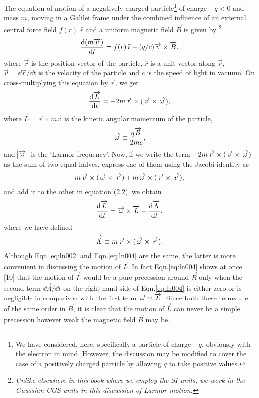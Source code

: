 The equation of motion of a negatively-charged 
particle\footnote{We have considered, here, specifically a 
particle of charge $-q$, obviously with the electron in 
mind. However, the discussion may be modified to cover the 
case of a positively charged particle by allowing $q$ to 
take positive values.} of char\-ge $-q < 0$ and mass $m$, 
moving in a Galilei frame under the combined influence of 
an external central force field $f(r)$ $\hat{r}$ and a 
uniform magnetic field $\vec{B}$ is given by 
\footnote{\textsl{Unlike elsewhere in this book where we 
employ the SI units, we work in the Gaussian CGS units in 
this discussion of Larmor motion.}}
\begin{align}
\frac{\mathrm{d}{(m\overrightarrow{v})}}{\mathrm{d}{t}} = f(r)\,{{\widehat{r}}} -
(q/c){\overrightarrow{v}}\times{\overrightarrow{B}},
\label{eq:ln001}
\end{align}
where $\vec{r}$ is the position vector of the particle, 
$\hat{r}$ is a unit vector along $\vec{r}$, $\vec{v} = 
\dd\vec{r}/\dd t$ is the velocity of the particle and $c$ 
is 
the speed of light in vacuum. On cross-multiplying this 
equation by $\vec{r}$, we get
\begin{align}
\frac{\mathrm{d}{\overrightarrow{L}}}{\mathrm{d}{t}} =
-2m{\overrightarrow{r}}\times{({\overrightarrow{v}}\times{\overrightarrow{\ensuremath{{\omega}}}})},
\label{eq:ln002}
\end{align}
where $\vec{L} = \vec{r}\times{m\vec{v}}$ is the kinetic
angular momentum of the particle,
\begin{align}
 \overrightarrow{{\omega}} \equiv \frac{q\overrightarrow{B}}{2mc},
\label{eq:ln003}
\end{align}
and $\abs{\overrightarrow{{\omega}}}$ is the `Larmor frequency'. Now, if 
we 
write the term $-2m{\overrightarrow{r}}\times{({\overrightarrow{v}}} 
\times{{\overrightarrow{\ensuremath{{\omega}}}})}$ as the sum of two equal halves, 
express one of them using the Jacobi identity as \[ 
m{\overrightarrow{v}}\times{({\overrightarrow{\ensuremath{{\omega}}}}\times{\overrightarrow{r}})} + 
m{\overrightarrow{{\omega}}}\times{({\overrightarrow{r}}\times{\overrightarrow{v}})}, \] and add 
it 
to the other in equation (2.2), we obtain
\begin{align}
\frac{\mathrm{d}{\overrightarrow{L}}}{\mathrm{d}{t}} = {\overrightarrow{{\omega}}}\times{\overrightarrow{L}} +
\frac{\mathrm{d}{\overrightarrow{\Lambda}}}{\mathrm{d}{t}},
\label{eq:ln004}
\end{align}
where we have defined
\begin{align}
 \overrightarrow{\Lambda} \equiv
m{\overrightarrow{r}}\times{({\overrightarrow{\ensuremath{{\omega}}}}\times{\overrightarrow{r}})}.
\label{eq:ln005}
\end{align}
Although Eqn.\eqref{eq:ln002} and Eqn.\eqref{eq:ln004} are 
the 
same, the latter is more convenient in discussing the 
motion 
of $\vec{L}$. In fact Eqn.\eqref{eq:ln004} shows at once 
[10] 
that the motion of $\vec{L}$  would be a pure precession 
around $\vec{B}$ only when the second term 
$\dd\vec{\Lambda}/\dd t$ on the right hand side of 
Eqn.\eqref{eq:ln004} is either zero or is negligible in 
comparison with the first term 
${\overrightarrow{{\omega}}}\times{\overrightarrow{L}}$. 
Since both these terms are of the same order in $\vec{B}$, 
it is clear that the motion of $\vec{L}$ can never be a 
simple precession however weak the magnetic field $\vec{B}$ 
may be.

